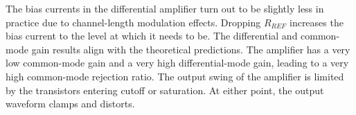 The bias currents in the differential amplifier turn out to be slightly less in practice due to channel-length modulation effects.
Dropping $R_{REF}$ increases the bias current to the level at which it needs to be.
The differential and common-mode gain results align with the theoretical predictions.
The amplifier has a very low common-mode gain and a very high differential-mode gain, leading to a very high common-mode rejection ratio.
The output swing of the amplifier is limited by the transistors entering cutoff or saturation.
At either point, the output waveform clamps and distorts.
